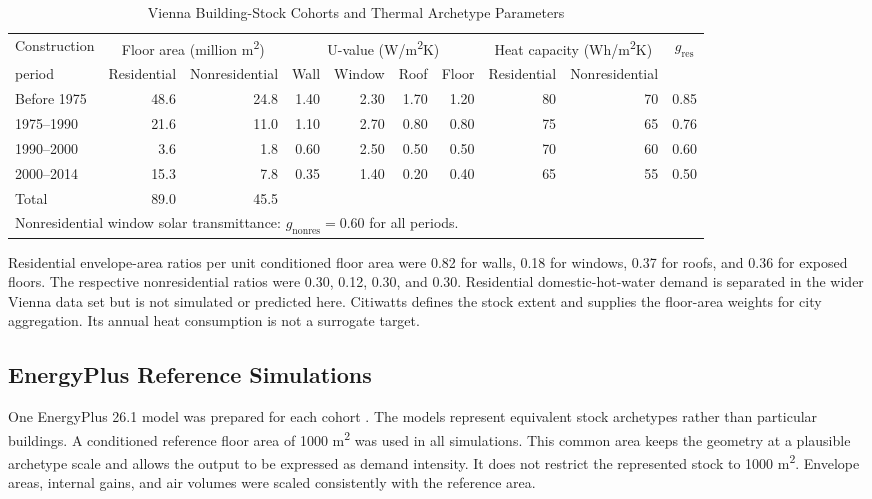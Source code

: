\documentclass[conference]{IEEEtran}
\begin{document}
\begin{table}[t]
\caption{Vienna Building-Stock Cohorts and Thermal Archetype Parameters}
\label{tab:cohorts}
\centering
\scriptsize
\setlength{\tabcolsep}{3.4pt}
\begin{tabular}{lrrrrrrrrr}
\toprule
Construction &
\multicolumn{2}{c}{Floor area (million m\textsuperscript{2})} &
\multicolumn{4}{c}{U-value (W/m\textsuperscript{2}K)} &
\multicolumn{2}{c}{Heat capacity (Wh/m\textsuperscript{2}K)} &
\multicolumn{1}{c}{$g_{\mathrm{res}}$} \\
\cmidrule(lr){2-3}\cmidrule(lr){4-7}\cmidrule(lr){8-9}
period & Residential & Nonresidential & Wall & Window & Roof & Floor &
Residential & Nonresidential & \\
\midrule
Before 1975 & 48.6 & 24.8 & 1.40 & 2.30 & 1.70 & 1.20 & 80 & 70 & 0.85 \\
1975--1990  & 21.6 & 11.0 & 1.10 & 2.70 & 0.80 & 0.80 & 75 & 65 & 0.76 \\
1990--2000  &  3.6 &  1.8 & 0.60 & 2.50 & 0.50 & 0.50 & 70 & 60 & 0.60 \\
2000--2014  & 15.3 &  7.8 & 0.35 & 1.40 & 0.20 & 0.40 & 65 & 55 & 0.50 \\
\midrule
Total & 89.0 & 45.5 & \multicolumn{7}{c}{} \\
\bottomrule
\multicolumn{10}{l}{\footnotesize Nonresidential window solar transmittance:
$g_{\mathrm{nonres}}=0.60$ for all periods.}
\end{tabular}
\end{table}

Residential envelope-area ratios per unit conditioned floor area were 0.82
for walls, 0.18 for windows, 0.37 for roofs, and 0.36 for exposed floors.
The respective nonresidential ratios were 0.30, 0.12, 0.30, and 0.30.
Residential domestic-hot-water demand is separated in the wider Vienna data
set but is not simulated or predicted here. Citiwatts defines the stock extent
and supplies the floor-area weights for city aggregation. Its annual heat
consumption is not a surrogate target.

\subsection{EnergyPlus Reference Simulations}

One EnergyPlus 26.1 model was prepared for each cohort
\cite{EnergyPlus2026}. The models
represent equivalent stock archetypes rather than particular buildings. A
conditioned reference floor area of 1000 m\textsuperscript{2} was used in all
simulations. This common area keeps the geometry at a plausible archetype scale
and allows the output to be expressed as demand intensity. It does not restrict
the represented stock to 1000 m\textsuperscript{2}. Envelope areas, internal
gains, and air volumes were scaled consistently with the reference area.
\end{document}
